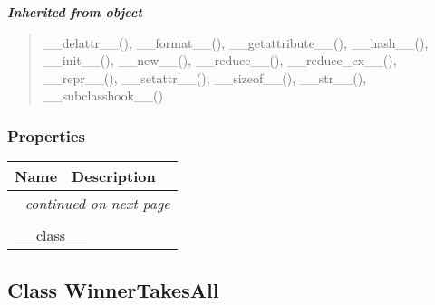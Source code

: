 \large{\textbf{\textit{Inherited from object}}}

\begin{quote}
\_\_delattr\_\_(), \_\_format\_\_(), \_\_getattribute\_\_(), \_\_hash\_\_(), \_\_init\_\_(), \_\_new\_\_(), \_\_reduce\_\_(), \_\_reduce\_ex\_\_(), \_\_repr\_\_(), \_\_setattr\_\_(), \_\_sizeof\_\_(), \_\_str\_\_(), \_\_subclasshook\_\_()
\end{quote}


  \subsubsection{Properties}

    \vspace{-1cm}
\hspace{\varindent}\begin{longtable}{|p{\varnamewidth}|p{\vardescrwidth}|l}
\cline{1-2}
\cline{1-2} \centering \textbf{Name} & \centering \textbf{Description}& \\
\cline{1-2}
\endhead\cline{1-2}\multicolumn{3}{r}{\small\textit{continued on next page}}\\\endfoot\cline{1-2}
\endlastfoot\multicolumn{2}{|l|}{\textit{Inherited from object}}\\
\multicolumn{2}{|p{\varwidth}|}{\raggedright \_\_class\_\_}\\
\cline{1-2}
\end{longtable}



\subsection{Class WinnerTakesAll}

